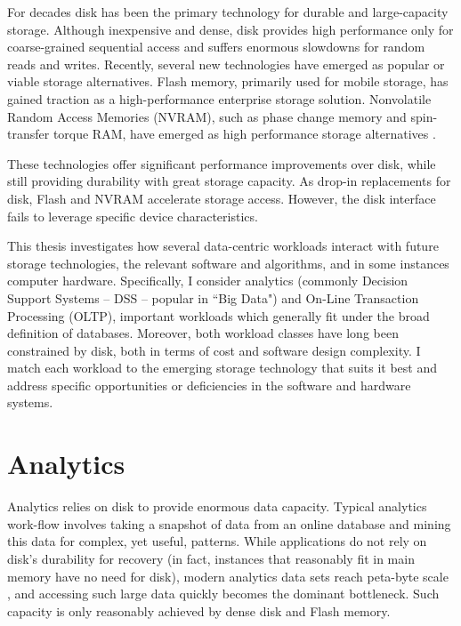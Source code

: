 For decades disk has been the primary technology for durable and large-capacity storage.
Although inexpensive and dense, disk provides high performance only for coarse-grained sequential access and suffers enormous slowdowns for random reads and writes.
Recently, several new technologies have emerged as popular or viable storage alternatives.
Flash memory, primarily used for mobile storage, has gained traction as a high-performance enterprise storage solution.
Nonvolatile Random Access Memories (NVRAM), such as phase change memory and spin-transfer torque RAM, have emerged as high performance storage alternatives \cite{BurrKurdi08}.

These technologies offer significant performance improvements over disk, while still providing durability with great storage capacity.
As drop-in replacements for disk, Flash and NVRAM accelerate storage access.
However, the disk interface fails to leverage specific device characteristics.

This thesis investigates how several data-centric workloads interact with future storage technologies, the relevant software and algorithms, and in some instances computer hardware.
Specifically, I consider analytics (commonly Decision Support Systems -- DSS -- popular in ``Big Data") and On-Line Transaction Processing (OLTP), important workloads which generally fit under the broad definition of databases.
Moreover, both workload classes have long been constrained by disk, both in terms of cost and software design complexity.
I match each workload to the emerging storage technology that suits it best and address specific opportunities or deficiencies in the software and hardware systems.

\section{Analytics}
\label{sec:Intro:Analytics}

Analytics relies on disk to provide enormous data capacity.
Typical analytics work-flow involves taking a snapshot of data from an online database and mining this data for complex, yet useful, patterns.
While applications do not rely on disk's durability for recovery (in fact, instances that reasonably fit in main memory have no need for disk), modern analytics data sets reach peta-byte scale \cite{Economist10}, and accessing such large data quickly becomes the dominant bottleneck.
Such capacity is only reasonably achieved by dense disk and Flash memory.

